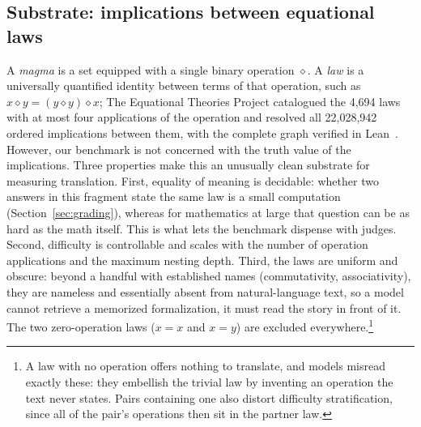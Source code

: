 \documentclass{article}
\newcommand{\shivam}[1]{\textcolor{magenta}{(Shivam: #1)}}
\newcommand{\denis}[1]{\textcolor{red}{(Denis: #1)}}
\newcommand{\harsh}[1]{\textcolor{olive}{(Harsh: #1)}}
\begin{document}
\subsection{Substrate: implications between equational laws}
A \textit{magma} is a set equipped with a single binary operation
$\diamond$. A \textit{law} is a universally quantified
identity between terms of that operation, such as
$x \diamond y = (y \diamond y) \diamond x$;  The Equational Theories Project
catalogued the 4{,}694 laws with at most four applications of the operation
and resolved all 22{,}028{,}942 ordered implications between them, with the
complete graph verified in Lean~\citep{bolan2025etp}. However, our benchmark is not concerned with the truth value of the implications. 
Three properties make this an unusually clean substrate for measuring
translation. First, equality of meaning is decidable: whether two answers
in this fragment state the same law is a small computation
(Section~\ref{sec:grading}), whereas for mathematics at large that question
can be as hard as the math itself. This is what lets the benchmark
dispense with judges. Second, difficulty is controllable and scales with the number of operation applications and the maximum
nesting depth. Third, the laws are uniform and obscure: beyond a handful
with established names (commutativity, associativity), they are nameless and
essentially absent from natural-language text, so a model cannot retrieve a
memorized formalization, it must read the story in front of it.
The two zero-operation laws ($x = x$ and
$x = y$) are excluded everywhere.\footnote{A law with no operation offers
nothing to translate, and models misread exactly these: they embellish the
trivial law by inventing an operation the text never states. Pairs
containing one also distort difficulty stratification, since all of the
pair's operations then sit in the partner law.}
\end{document}
